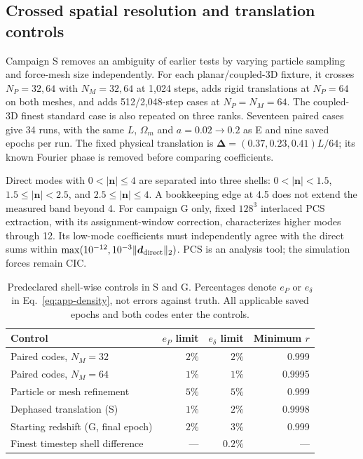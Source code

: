 
\subsection{Crossed spatial resolution and translation controls}
\label{app:spatial}

Campaign S removes an ambiguity of earlier tests by varying particle sampling
and force-mesh size independently.  For each planar/coupled-3D fixture, it
crosses $N_P=32,64$ with $N_M=32,64$ at 1,024 steps, adds rigid translations
at $N_P=64$ on both meshes, and adds 512/2,048-step cases at $N_P=N_M=64$.
The coupled-3D finest standard case is also repeated on three ranks.  Seventeen
paired cases give 34 runs, with the same $L$, $\Omega_m$ and $a=0.02\to0.2$
as E and nine saved epochs per run.  The fixed physical translation is
$\boldsymbol\Delta=(0.37,0.23,0.41)L/64$; its known Fourier phase is removed
before comparing coefficients.

Direct modes with $0<|\boldsymbol n|\le4$ are separated into three shells:
$0<|\boldsymbol n|<1.5$, $1.5\le|\boldsymbol n|<2.5$, and
$2.5\le|\boldsymbol n|\le4$.  A bookkeeping edge at 4.5 does not extend the
measured band beyond 4.  For campaign G only, fixed $128^3$ interlaced PCS
extraction, with its assignment-window correction, characterizes higher modes
through 12.  Its
low-mode coefficients must independently agree with the direct sums within
$\max(10^{-12},10^{-3}\|\boldsymbol d_{\rm direct}\|_2)$.
PCS is an analysis tool; the simulation forces remain CIC.

\begin{table}[htbp]
\centering
\caption{Predeclared shell-wise controls in S and G.  Percentages denote
$e_P$ or $e_\delta$ in Eq.~\eqref{eq:app-density}, not errors against truth.
All applicable saved epochs and both codes enter the controls.}
\label{tab:app-budgets}
\begin{tabular}{@{}lrrr@{}}
\toprule Control & $e_P$ limit & $e_\delta$ limit & Minimum $r$ \\
\midrule
Paired codes, $N_M=32$ & $2\%$ & $2\%$ & 0.999 \\
Paired codes, $N_M=64$ & $1\%$ & $1\%$ & 0.9995 \\
Particle or mesh refinement & $5\%$ & $5\%$ & 0.999 \\
Dephased translation (S) & $1\%$ & $2\%$ & 0.9998 \\
Starting redshift (G, final epoch) & $2\%$ & $3\%$ & 0.999 \\
Finest timestep shell difference & --- & $0.2\%$ & --- \\
\bottomrule
\end{tabular}
\end{table}

